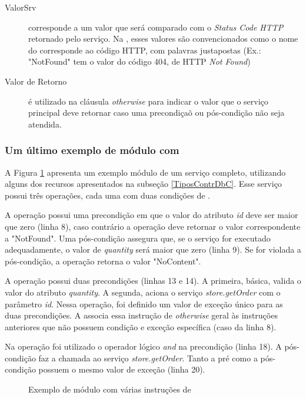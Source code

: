 \begin{description}
 \item [ValorSrv] corresponde a um valor que será comparado com o
 \textit{Status Code HTTP} retornado pelo serviço. Na \neoidl{}, esses valores
 são convencionados como o nome do corresponde ao código HTTP, com palavras
 justapostas (Ex.: "NotFound" tem o valor do código 404, de HTTP \textit{Not
 Found})

\item [Valor de Retorno] é utilizado na cláusula \emph{otherwise} para indicar o
valor que o serviço principal deve retornar caso uma precondiçaõ ou pós-condição
não seja atendida.

\end{description}


\subsubsection{Um último exemplo de módulo com \designbycontract{}}

A Figura \ref{lst:ModuloNeoVariosDbC} apresenta um exemplo módulo \neoidl{} de
um serviço completo, utilizando alguns dos recursos apresentados na subseção
\ref{TiposContrDbC}. Esse serviço possui três operações, cada uma com duas
condições de \designbycontract{}.

A operação  possui uma precondição em que o valor do atributo \emph{id} deve ser maior que zero (linha 8), caso contrário a operação deve retornar o valor
correspondente a "NotFound". Uma pós-condição assegura que, se o serviço for
executado adequadamente, o valor de \emph{quantity} será maior que zero (linha
9). Se for violada a pós-condição, a operação  retorna o valor
"NoContent".

A operação  possui duas precondições (linhas 13 e 14). A primeira,
básica, valida o valor do atributo \emph{quantity}. A segunda, aciona o serviço
\emph{store.getOrder} com o parâmetro \emph{id}. Nessa operação, foi
definido um valor de exceção único para as duas precondições. A \neoidl{}
associa essa instrução de \emph{otherwise} geral às instruções anteriores que
não possuem condição e exceção específica (caso da linha 8).

Na operação  foi utilizado o operador lógico \emph{and} na
precondição (linha 18). A pós-condição faz a chamada ao serviço
\emph{store.getOrder}. Tanto a pré como a pós-condição possuem o mesmo valor de
exceção (linha 20). 

\begin{figure}[htb]
\begin{small}

\end{small}
\caption{Exemplo de módulo \neoidl{} com várias instruções de \designbycontract{}}
\label{lst:ModuloNeoVariosDbC}
\end{figure} 	



